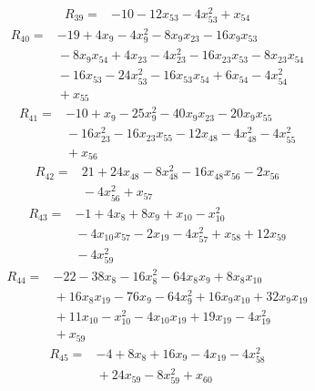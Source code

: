 {\begin{align*}
\end{align*}
\begin{align*}
R_{39} ={}& -10 - 12x_{53} - 4x_{53}^{2} + x_{54}
\end{align*}
\begin{align*}
R_{40} ={}& -19 + 4x_{9} - 4x_{9}^{2} - 8x_{9} x_{23} - 16x_{9} x_{53} \\
&{}  - 8x_{9} x_{54} + 4x_{23} - 4x_{23}^{2} - 16x_{23} x_{53} - 8x_{23} x_{54} \\
&{}  - 16x_{53} - 24x_{53}^{2} - 16x_{53} x_{54} + 6x_{54} - 4x_{54}^{2} \\
&{}  + x_{55}
\end{align*}
\begin{align*}
R_{41} ={}& -10 + x_{9} - 25x_{9}^{2} - 40x_{9} x_{23} - 20x_{9} x_{55} \\
&{}  - 16x_{23}^{2} - 16x_{23} x_{55} - 12x_{48} - 4x_{48}^{2} - 4x_{55}^{2} \\
&{}  + x_{56}
\end{align*}
\begin{align*}
R_{42} ={}& 21 + 24x_{48} - 8x_{48}^{2} - 16x_{48} x_{56} - 2x_{56} \\
&{}  - 4x_{56}^{2} + x_{57}
\end{align*}
\begin{align*}
R_{43} ={}& -1 + 4x_{8} + 8x_{9} + x_{10} - x_{10}^{2} \\
&{}  - 4x_{10} x_{57} - 2x_{19} - 4x_{57}^{2} + x_{58} + 12x_{59} \\
&{}  - 4x_{59}^{2}
\end{align*}
\begin{align*}
R_{44} ={}& -22 - 38x_{8} - 16x_{8}^{2} - 64x_{8} x_{9} + 8x_{8} x_{10} \\
&{}  + 16x_{8} x_{19} - 76x_{9} - 64x_{9}^{2} + 16x_{9} x_{10} + 32x_{9} x_{19} \\
&{}  + 11x_{10} - x_{10}^{2} - 4x_{10} x_{19} + 19x_{19} - 4x_{19}^{2} \\
&{}  + x_{59}
\end{align*}
\begin{align*}
R_{45} ={}& -4 + 8x_{8} + 16x_{9} - 4x_{19} - 4x_{58}^{2} \\
&{}  + 24x_{59} - 8x_{59}^{2} + x_{60}
\end{align*}
}

